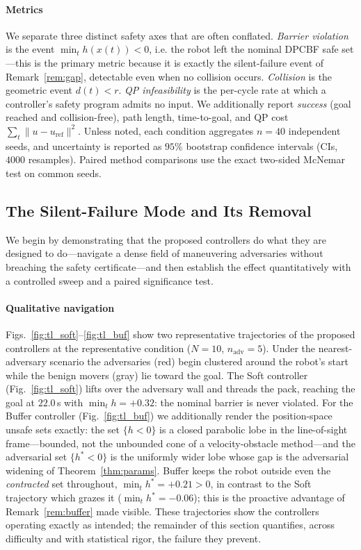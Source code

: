 \paragraph{Metrics}
We separate three distinct safety axes that are often conflated.
\emph{Barrier violation} is the event $\min_t h(x(t))<0$, i.e. the robot left
the nominal DPCBF safe set---this is the primary metric because it is exactly
the silent-failure event of Remark~\ref{rem:gap}, detectable even when no
collision occurs. \emph{Collision} is the geometric event $d(t)<r$.
\emph{QP infeasibility} is the per-cycle rate at which a controller's safety
program admits no input. We additionally report \emph{success} (goal reached
and collision-free), path length, time-to-goal, and QP cost
$\sum_t\lVert u-u_{\mathrm{ref}}\rVert^2$. Unless noted, each condition
aggregates $n=40$ independent seeds, and uncertainty is reported as $95\%$
bootstrap confidence intervals (CIs, $4000$ resamples). Paired method
comparisons use the exact two-sided McNemar test on common seeds.

\subsection{The Silent-Failure Mode and Its Removal}
\label{sec:core}

We begin by demonstrating that the proposed controllers do what they are
designed to do---navigate a dense field of maneuvering adversaries without
breaching the safety certificate---and then establish the effect
quantitatively with a controlled sweep and a paired significance test.

\paragraph{Qualitative navigation}
Figs.~\ref{fig:tl_soft}--\ref{fig:tl_buf} show two representative
trajectories of the proposed controllers at the representative condition
($N=10$, $n_{\mathrm{adv}}=5$). Under the nearest-adversary scenario the
adversaries (red) begin clustered around the robot's start while the benign
movers (gray) lie toward the goal. The Soft controller
(Fig.~\ref{fig:tl_soft}) lifts over the adversary wall and threads the pack,
reaching the goal at $22.0$\,s with $\min_t h=+0.32$: the nominal barrier is
never violated. For the Buffer controller (Fig.~\ref{fig:tl_buf}) we
additionally render the position-space unsafe sets exactly: the set $\{h<0\}$
is a closed parabolic lobe in the line-of-sight frame---bounded, not the
unbounded cone of a velocity-obstacle method---and the adversarial set
$\{h^*<0\}$ is the uniformly wider lobe whose gap is the adversarial widening
of Theorem~\ref{thm:params}. Buffer keeps the robot outside even the
\emph{contracted} set throughout, $\min_t h^*=+0.21>0$, in contrast to the
Soft trajectory which grazes it ($\min_t h^*=-0.06$); this is the proactive
advantage of Remark~\ref{rem:buffer} made visible. These trajectories show
the controllers operating exactly as intended; the remainder of this section
quantifies, across difficulty and with statistical rigor, the failure they
prevent.

